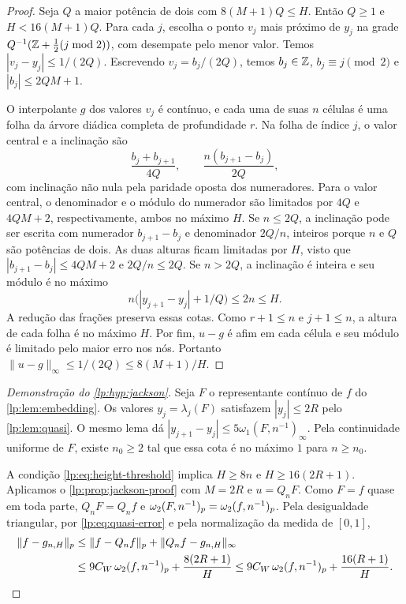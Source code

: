 \documentclass[12pt,a4paper]{article}
\begin{document}
\begin{proof}
Seja $Q$ a maior potência de dois com $8(M+1)Q\le H$. Então $Q\ge1$ e $H<16(M+1)Q$. Para cada $j$, escolha o ponto $v_j$ mais próximo de $y_j$ na grade
$Q^{-1}(\mathbb Z+\tfrac12(j\bmod 2))$, com desempate pelo menor valor. Temos $|v_j-y_j|\le1/(2Q)$. Escrevendo $v_j=b_j/(2Q)$, temos $b_j\in\mathbb Z$, $b_j\equiv j\pmod 2$ e $|b_j|\le2QM+1$.

O interpolante $g$ dos valores $v_j$ é contínuo, e cada uma de suas $n$ células é uma folha da árvore diádica completa de profundidade $r$. Na folha de índice $j$, o valor central e a inclinação são
\[
 \frac{b_j+b_{j+1}}{4Q},
 \qquad
 \frac{n(b_{j+1}-b_j)}{2Q},
\]
com inclinação não nula pela paridade oposta dos numeradores. Para o valor central, o denominador e o módulo do numerador são limitados por $4Q$ e $4QM+2$, respectivamente, ambos no máximo $H$. Se $n\le2Q$, a inclinação pode ser escrita com numerador $b_{j+1}-b_j$ e denominador $2Q/n$, inteiros porque $n$ e $Q$ são potências de dois. As duas alturas ficam limitadas por $H$, visto que $|b_{j+1}-b_j|\le4QM+2$ e $2Q/n\le2Q$. Se $n>2Q$, a inclinação é inteira e seu módulo é no máximo
\[
 n\bigl(|y_{j+1}-y_j|+1/Q\bigr)\le2n\le H.
\]
A redução das frações preserva essas cotas. Como $r+1\le n$ e $j+1\le n$, a altura de cada folha é no máximo $H$. Por fim, $u-g$ é afim em cada célula e seu módulo é limitado pelo maior erro nos nós. Portanto $\|u-g\|_\infty\le1/(2Q)\le8(M+1)/H$.
\end{proof}

\begin{proof}[Demonstração do \cref{lp:hyp:jackson}]
Seja $F$ o representante contínuo de $f$ do \cref{lp:lem:embedding}. Os valores $y_j=\lambda_j(F)$ satisfazem $|y_j|\le2R$ pelo \cref{lp:lem:quasi}. O mesmo lema dá
$|y_{j+1}-y_j|\le5\omega_1(F,n^{-1})_\infty$. Pela continuidade uniforme de $F$, existe $n_0\ge2$ tal que essa cota é no máximo $1$ para $n\ge n_0$.

A condição \eqref{lp:eq:height-threshold} implica $H\ge8n$ e $H\ge16(2R+1)$. Aplicamos o \cref{lp:prop:jackson-proof} com $M=2R$ e $u=Q_nF$. Como $F=f$ quase em toda parte, $Q_nF=Q_nf$ e $\omega_2(F,n^{-1})_{p}=\omega_2(f,n^{-1})_{p}$. Pela desigualdade triangular, por \eqref{lp:eq:quasi-error} e pela normalização da medida de $[0,1]$,
\begin{align*}
 \|f-g_{n,H}\|_p
 &\le\|f-Q_nf\|_p+\|Q_nf-g_{n,H}\|_\infty\\
 &\le9C_W\,\omega_2(f,n^{-1})_{p}+\frac{8(2R+1)}{H}
 \le9C_W\,\omega_2(f,n^{-1})_{p}+\frac{16(R+1)}{H}.\qedhere
\end{align*}
\end{proof}
\end{document}
